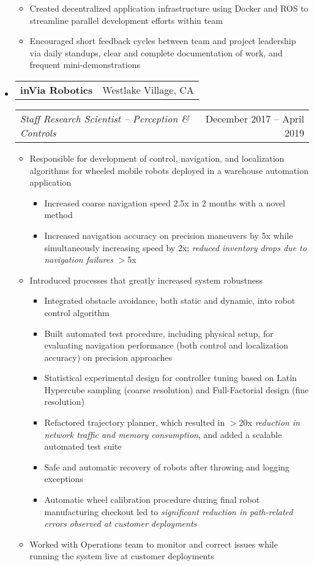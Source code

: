 \documentclass[letterpaper,18pt]{article}
\makeatletter
\newcommand{\resitem}[1]{\item #1 \vspace{-2pt}}
\newcommand{\headerrow}[2]{%
  \hspace*{-\labelsep}%
  \begin{tabular*}{\dimexpr\linewidth+\labelsep}{@{\extracolsep{\fill}}lr@{}}
    #1 &
    #2 \\
  \end{tabular*}%
}
\makeatother
\begin{document}
\begin{itemize}[label={},leftmargin=*,noitemsep]
{\begin{itemize}[noitemsep]
\begin{itemize}[noitemsep]
		        \resitem{Created decentralized application infrastructure using Docker and ROS to streamline parallel development efforts within team}
		        \resitem{Encouraged short feedback cycles between team and project leadership via daily standups, clear and complete documentation of work, and frequent mini-demonstrations}
        \end{itemize}
	\end{itemize}
	}
\item
	\headerrow{\textbf{inVia Robotics}}{Westlake Village, CA}
	\headerrow{\emph{Staff Research Scientist -- Perception \& Controls}}{December 2017 -- April 2019}
	{\small
	\begin{itemize}[noitemsep]
		\resitem{Responsible for development of control, navigation, and localization algorithms for wheeled mobile robots deployed in a warehouse automation application}
        \begin{itemize}[noitemsep]
                \resitem{Increased coarse navigation speed 2.5x in 2 months with a novel method}
                \resitem{Increased navigation accuracy on precision maneuvers by 5x while simultaneously increasing speed by 2x; \textit{reduced inventory drops due to navigation failures} $>$5x}
        \end{itemize}
		\resitem{Introduced processes that greatly increased system robustness}
        \begin{itemize}[noitemsep]
                \resitem{Integrated obstacle avoidance, both static and dynamic, into robot control algorithm}
                \resitem{Built automated test procedure, including physical setup, for evaluating navigation performance (both control and localization accuracy) on precision approaches}
                \resitem{Statistical experimental design for controller tuning based on Latin Hypercube sampling (coarse resolution) and Full-Factorial design (fine resolution)}
                \resitem{Refactored trajectory planner, which resulted in $>$20x \textit{reduction in network traffic and memory consumption}, and added a scalable automated test suite}
                \resitem{Safe and automatic recovery of robots after throwing and logging exceptions}
                \resitem{Automatic wheel calibration procedure during final robot manufacturing checkout led to \textit{significant reduction in path-related errors observed at customer deployments}}
        \end{itemize}
        \resitem{Worked with Operations team to monitor and correct issues while running the system live at customer deployments}  

\end{itemize}}
\end{itemize}
\end{document}

